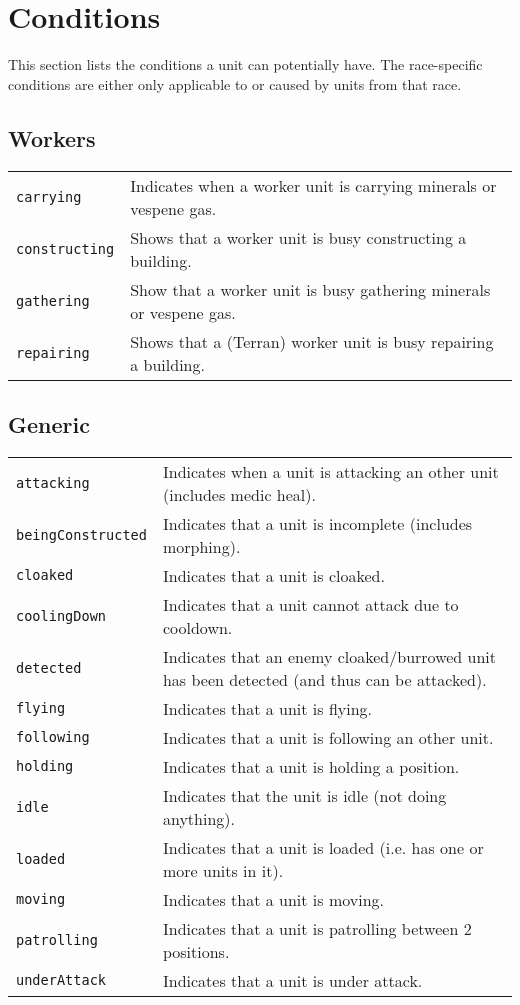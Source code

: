 \newpage
\section{Conditions}
\label{conditions}
This section lists the conditions a unit can potentially have. The race-specific conditions are either only applicable to or caused by units from that race.

\subsection{Workers}
\begin{tabularx}{\textwidth}{lX}
 \verb|carrying| & Indicates when a worker unit is carrying minerals or vespene gas. \\
 \verb|constructing| & Shows that a worker unit is busy constructing a building. \\
 \verb|gathering| & Show that a worker unit is busy gathering minerals or vespene gas. \\
 \verb|repairing| & Shows that a (Terran) worker unit is busy repairing a building.
\end{tabularx}

\subsection{Generic}
\begin{tabularx}{\textwidth}{lX}
 \verb|attacking| & Indicates when a unit is attacking an other unit (includes medic heal). \\
 \verb|beingConstructed| & Indicates that a unit is incomplete (includes morphing). \\
 \verb|cloaked| & Indicates that a unit is cloaked. \\
 \verb|coolingDown| & Indicates that a unit cannot attack due to cooldown. \\
 \verb|detected| & Indicates that an enemy cloaked/burrowed unit has been detected (and thus can be attacked). \\
 \verb|flying| & Indicates that a unit is flying. \\
 \verb|following| & Indicates that a unit is following an other unit. \\
 \verb|holding| & Indicates that a unit is holding a position. \\
 \verb|idle| & Indicates that the unit is idle (not doing anything). \\
 \verb|loaded| & Indicates that a unit is loaded (i.e. has one or more units in it). \\
 \verb|moving| & Indicates that a unit is moving. \\
 \verb|patrolling| & Indicates that a unit is patrolling between 2 positions. \\
 \verb|underAttack| & Indicates that a unit is under attack.
\end{tabularx}

